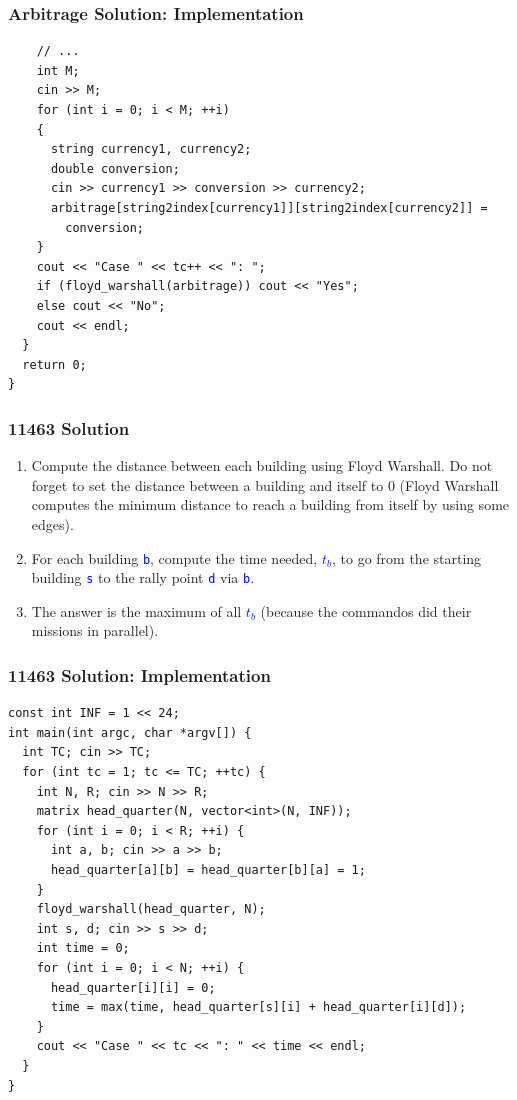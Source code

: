 \documentclass{beamer}
\begin{document}
\begin{frame}[containsverbatim]
\frametitle{Arbitrage Solution: Implementation}

\scriptsize
\begin{lstlisting}
    // ...
    int M;
    cin >> M;
    for (int i = 0; i < M; ++i)
    {
      string currency1, currency2;
      double conversion;
      cin >> currency1 >> conversion >> currency2;
      arbitrage[string2index[currency1]][string2index[currency2]] =
        conversion;
    }
    cout << "Case " << tc++ << ": ";
    if (floyd_warshall(arbitrage)) cout << "Yes";
    else cout << "No";
    cout << endl;
  }
  return 0;
}
\end{lstlisting}

\end{frame}

\begin{frame}%
\frametitle{11463 Solution}

\begin{enumerate}

\item Compute the distance between each building using Floyd Warshall. Do not forget to
set the distance between a building and itself to $0$ (Floyd Warshall computes the minimum distance to reach a building from itself
by using some edges).

\vspace{0.3cm}

\item<2-> For each building \textcolor{blue}{\texttt{b}}, compute the time needed, \textcolor{blue}{$t_b$},
to go from the starting building \textcolor{blue}{\texttt{s}} to the rally point \textcolor{blue}{\texttt{d}} via \textcolor{blue}{\texttt{b}}.

\vspace{0.3cm}

\item<3-> The answer is the maximum of all \textcolor{blue}{$t_b$} (because the commandos did their missions in parallel).

\end{enumerate}

\end{frame}


\begin{frame}[containsverbatim]
\frametitle{11463 Solution: Implementation}

\scriptsize
\begin{lstlisting}
const int INF = 1 << 24;
int main(int argc, char *argv[]) {
  int TC; cin >> TC;
  for (int tc = 1; tc <= TC; ++tc) {
    int N, R; cin >> N >> R;
    matrix head_quarter(N, vector<int>(N, INF));
    for (int i = 0; i < R; ++i) {
      int a, b; cin >> a >> b;
      head_quarter[a][b] = head_quarter[b][a] = 1;
    }
    floyd_warshall(head_quarter, N);
    int s, d; cin >> s >> d;
    int time = 0;
    for (int i = 0; i < N; ++i) {
      head_quarter[i][i] = 0;
      time = max(time, head_quarter[s][i] + head_quarter[i][d]);
    }
    cout << "Case " << tc << ": " << time << endl;
  }
}
\end{lstlisting}

\end{frame}
\end{document}
